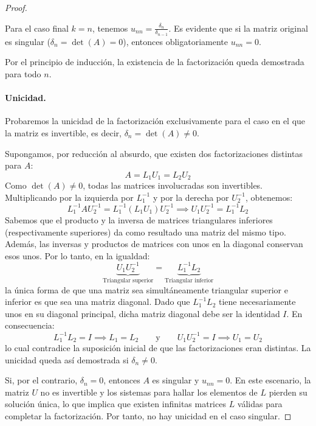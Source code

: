 \begin{proof}
\begin{enumerate}
        Para el caso final $k = n$, tenemos $u_{nn} = \frac{\delta_n}{\delta_{n-1}}$. Es evidente que si la matriz original es singular ($\delta_n = \det(A) = 0$), entonces obligatoriamente $u_{nn} = 0$.
    \end{enumerate}
    Por el principio de inducción, la existencia de la factorización queda demostrada para todo $n$.

    \paragraph{Unicidad.} Probaremos la unicidad de la factorización exclusivamente para el caso en el que la matriz es invertible, es decir, $\delta_n = \det(A) \neq 0$. 
    
    Supongamos, por reducción al absurdo, que existen dos factorizaciones distintas para $A$:
    \[
        A = L_1 U_1 = L_2 U_2
    \]
    Como $\det(A) \neq 0$, todas las matrices involucradas son invertibles. Multiplicando por la izquierda por $L_1^{-1}$ y por la derecha por $U_2^{-1}$, obtenemos:
    \[
        L_1^{-1} A U_2^{-1} = L_1^{-1} (L_1 U_1) U_2^{-1} \implies U_1 U_2^{-1} = L_1^{-1} L_2
    \]
    Sabemos que el producto y la inversa de matrices triangulares inferiores (respectivamente superiores) da como resultado una matriz del mismo tipo. Además, las inversas y productos de matrices con unos en la diagonal conservan esos unos. 
    Por lo tanto, en la igualdad:
    \[
        \underbrace{U_1 U_2^{-1}}_{\text{Triangular superior}} = \underbrace{L_1^{-1} L_2}_{\text{Triangular inferior}}
    \]
    la única forma de que una matriz sea simultáneamente triangular superior e inferior es que sea una matriz diagonal. Dado que $L_1^{-1} L_2$ tiene necesariamente unos en su diagonal principal, dicha matriz diagonal debe ser la identidad $I$. En consecuencia:
    \[
        L_1^{-1} L_2 = I \implies L_1 = L_2 \qquad \text{y} \qquad U_1 U_2^{-1} = I \implies U_1 = U_2
    \]
    lo cual contradice la suposición inicial de que las factorizaciones eran distintas. La unicidad queda así demostrada si $\delta_n \neq 0$.

    Si, por el contrario, $\delta_n = 0$, entonces $A$ es singular y $u_{nn} = 0$. En este escenario, la matriz $U$ no es invertible y los sistemas para hallar los elementos de $L$ pierden su solución única, lo que implica que existen infinitas matrices $L$ válidas para completar la factorización. Por tanto, no hay unicidad en el caso singular.
\end{proof}


